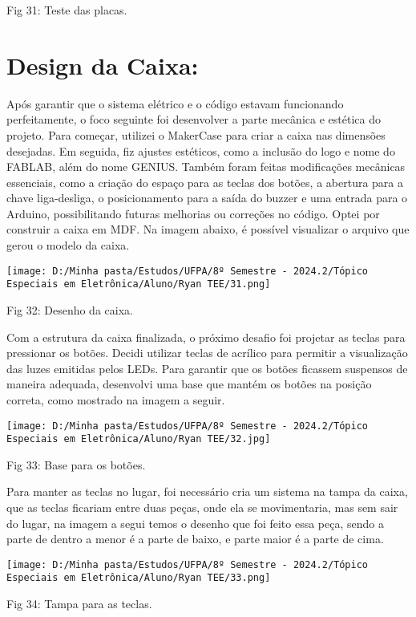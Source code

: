 \documentclass[
]{book}
\begin{document}
Fig 31: Teste das placas.

\section{Design da Caixa:}\label{design-da-caixa}

Após garantir que o sistema elétrico e o código estavam funcionando perfeitamente, o foco seguinte foi desenvolver a parte mecânica e estética do projeto. Para começar, utilizei o MakerCase para criar a caixa nas dimensões desejadas. Em seguida, fiz ajustes estéticos, como a inclusão do logo e nome do FABLAB, além do nome GENIUS. Também foram feitas modificações mecânicas essenciais, como a criação do espaço para as teclas dos botões, a abertura para a chave liga-desliga, o posicionamento para a saída do buzzer e uma entrada para o Arduino, possibilitando futuras melhorias ou correções no código. Optei por construir a caixa em MDF. Na imagem abaixo, é possível visualizar o arquivo que gerou o modelo da caixa.

\texttt{[image: D:/Minha pasta/Estudos/UFPA/8º Semestre - 2024.2/Tópico Especiais em Eletrônica/Aluno/Ryan TEE/31.png]}

Fig 32: Desenho da caixa.

Com a estrutura da caixa finalizada, o próximo desafio foi projetar as teclas para pressionar os botões. Decidi utilizar teclas de acrílico para permitir a visualização das luzes emitidas pelos LEDs. Para garantir que os botões ficassem suspensos de maneira adequada, desenvolvi uma base que mantém os botões na posição correta, como mostrado na imagem a seguir.

\texttt{[image: D:/Minha pasta/Estudos/UFPA/8º Semestre - 2024.2/Tópico Especiais em Eletrônica/Aluno/Ryan TEE/32.jpg]}

Fig 33: Base para os botões.

Para manter as teclas no lugar, foi necessário cria um sistema na tampa da caixa, que as teclas ficariam entre duas peças, onde ela se movimentaria, mas sem sair do lugar, na imagem a segui temos o desenho que foi feito essa peça, sendo a parte de dentro a menor é a parte de baixo, e parte maior é a parte de cima.

\texttt{[image: D:/Minha pasta/Estudos/UFPA/8º Semestre - 2024.2/Tópico Especiais em Eletrônica/Aluno/Ryan TEE/33.png]}

Fig 34: Tampa para as teclas.
\end{document}
